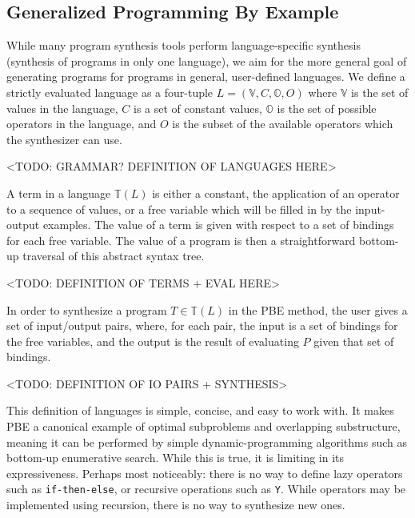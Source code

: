 \documentclass[acmsmall]{acmart}
\begin{document}
\subsection{Generalized Programming By Example}

While many program synthesis tools perform language-specific synthesis (synthesis of programs in only one language), we aim for the more general goal of generating programs for programs in general, user-defined languages. We define a strictly evaluated language as a four-tuple $L = (\mathbb{V}, C, \mathbb{O}, O)$ where $\mathbb{V}$ is the set of values in the language, $C$ is a set of constant values, $\mathbb{O}$ is the set of possible operators in the language, and $O$ is the subset of the available operators which the synthesizer can use. 

<TODO: GRAMMAR? DEFINITION OF LANGUAGES HERE>
      
A term in a language $\mathbb{T}(L)$ is either a constant, the application of an operator to a sequence of values, or a free variable which will be filled in by the input-output examples. The value of a term is given with respect to a set of bindings for each free variable. The value of a program is then a straightforward bottom-up traversal of this abstract syntax tree.

<TODO: DEFINITION OF TERMS + EVAL HERE>

In order to synthesize a program $T \in \mathbb{T}(L)$ in the PBE method, the user gives a set of input/output pairs, where, for each pair, the input is a set of bindings for the free variables, and the output is the result of evaluating $P$ given that set of bindings.

<TODO: DEFINITION OF IO PAIRS + SYNTHESIS>

This definition of languages is simple, concise, and easy to work with. It makes PBE a canonical example of optimal subproblems and overlapping substructure, meaning it can be performed by simple dynamic-programming algorithms such as bottom-up enumerative search. While this is true, it is limiting in its expressiveness. Perhaps most noticeably: there is no way to define lazy operators such as \verb|if-then-else|, or recursive operations such as \verb|Y|. While operators may be implemented using recursion, there is no way to synthesize new ones.

\end{document}
